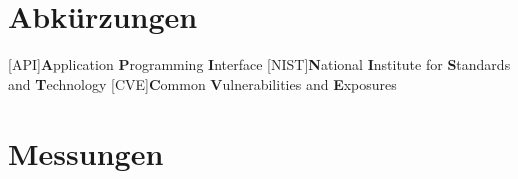 \documentclass[10pt,a4paper,twoside]{article}
\begin{document}
    \newpage

    
    \newpage
    
    \newpage
    
    \newpage
    
    \newpage
    
    \newpage
    
    \newpage
    
    \newpage
     


    \newpage
    \begin{appendices}
        \section{Abkürzungen} \label{sec:Abkürzungen}
        \begin{acronym}[LangesWortFuerDieEinstellung]
            [API]{\textbf{A}pplication \textbf{P}rogramming \textbf{I}nterface}
            [NIST]{\textbf{N}ational \textbf{I}nstitute for \textbf{S}tandards and \textbf{T}echnology}
            [CVE]{\textbf{C}ommon \textbf{V}ulnerabilities and \textbf{E}xposures}
        \end{acronym}
        \section{Messungen} \label{sec:Messungen}

\end{appendices}
\end{document}
